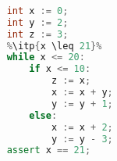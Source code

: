 \begin{lstlisting}[language=C++, style=withAssert]  % Start your code-block
	
	int x := 0;
	int y := 2;
	int z := 3;
	%\itp{x \leq 21}%
	while x <= 20:
		if x <= 10:
			z := x;
			x := x + y;
			y := y + 1;
		else:
			x := x + 2;
			y := y - 3;
	assert x == 21;
	\end{lstlisting}
